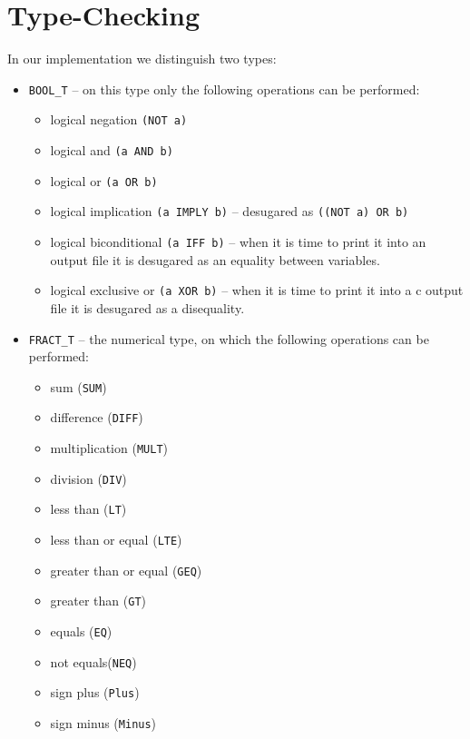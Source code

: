 \section{Type-Checking}
\label{sec:type-checking}
In our implementation we distinguish two types:
\begin{itemize}
\item \verb|BOOL_T| -- on this type only the following
operations can be performed:

\begin{itemize}
\item logical negation \verb|(NOT a)|
\item logical and \verb|(a AND b)|
\item logical or  \verb|(a OR b)|
\item logical implication \verb|(a IMPLY b)| --
desugared as \verb|((NOT a) OR b)|
\item logical biconditional \verb|(a IFF b)| -- when it is time
to print it into an output file it is desugared as an equality 
between variables.
\item logical exclusive or \verb|(a XOR b)| -- when it is time to print
it into a c output file it is desugared as a disequality.
\end{itemize}

\item \verb|FRACT_T| -- the numerical type, on which the following 
operations can be performed:
\begin{itemize}
\item sum (\verb|SUM|)
\item difference (\verb|DIFF|)
\item multiplication (\verb|MULT|)
\item division (\verb|DIV|)
\item less than (\verb|LT|)
\item less than or equal (\verb|LTE|)
\item greater than or equal (\verb|GEQ|)
\item greater than (\verb|GT|)
\item equals (\verb|EQ|)
\item not equals(\verb|NEQ|)
\item sign plus (\verb|Plus|)
\item sign minus (\verb|Minus|)
\end{itemize}
\end{itemize}
